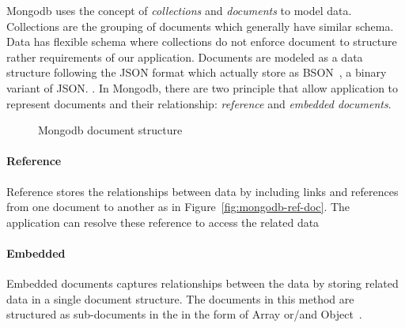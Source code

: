 
Mongodb uses the concept of \textit{collections} and \textit{documents} to model data. Collections are the grouping of documents which generally have similar schema. Data has flexible schema where collections do not enforce document to structure rather requirements of our application.  Documents are modeled as a data structure following the JSON format which actually store as BSON~\cite{bson}, a binary variant of JSON. . In Mongodb, there are two principle that allow application to represent documents and their relationship: \textit{reference} and \textit{embedded documents}. 
\begin{figure}
	\centering
	\centering
	\caption{Mongodb document structure}
	\label{fig:mongodb-doc}
	 
\end{figure}

\paragraph{Reference}
	Reference stores the relationships between data by including links and references from one document to another as in  Figure~\ref{fig:mongodb-ref-doc}. The application can resolve these reference to access the related data
\paragraph{Embedded}
	Embedded documents captures relationships between the data by storing related data in a single document structure. The documents in this method are structured as sub-documents in the in the form of Array or/and Object~\cite{nosql/comparision}. 
	\label{mong-xmark-indexing}
